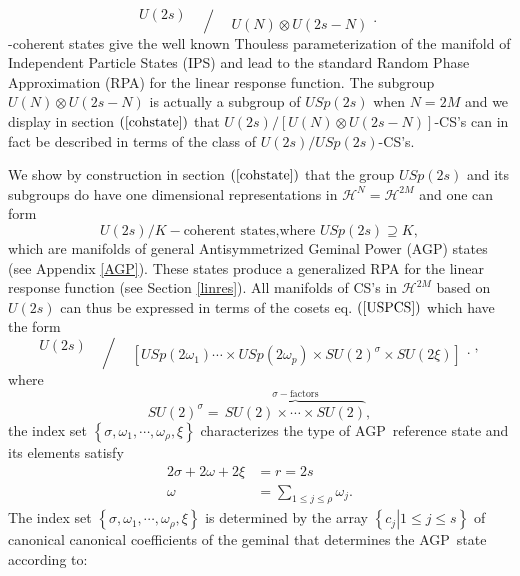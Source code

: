 \documentclass[aps,preprint]{revtex4}%
\begin{document}
\begin{equation}
U\left(  2s\right)
\genfrac{/}{.}{0pt}{}{{}}{U\left(  N\right)  \otimes U\left(  2s-N\right)  }%
\end{equation}
-coherent states give the well known Thouless parameterization \cite{thouless}
of the manifold of Independent Particle States (IPS) and lead to the standard
Random Phase Approximation (RPA) for the linear response function. The
subgroup $U\left(  N\right)  \otimes U\left(  2s-N\right)  $ is actually a
subgroup of $USp\left(  2s\right)  $ when $N=2M$ and we display in section
$\left(  \ref{cohstate}\right)  $ that $U\left(  2s\right)  /\left[  U\left(
N\right)  \otimes U\left(  2s-N\right)  \right]  $-CS's can in fact be
described in terms of the class of $U\left(  2s\right)  /USp\left(  2s\right)
$-CS's.

We show by construction in section $\left(  \ref{cohstate}\right)  $ that the
group $USp\left(  2s\right)  $ and its subgroups do have one dimensional
representations in $\mathcal{H}^{N}=\mathcal{H}^{2M}$ and one can form
\begin{equation}
U\left(  2s\right)  /K-\text{coherent states,where }USp\left(  2s\right)
\supseteq K, \label{USPCS}%
\end{equation}
which are manifolds of general Antisymmetrized Geminal Power (AGP) states (see
Appendix \ref{AGP}). These states produce a generalized RPA for the linear
response function (see Section \ref{linres}). All manifolds of CS's in
$\mathcal{H}^{2M}$ based on $U\left(  2s\right)  $ can thus be expressed in
terms of the cosets eq. $\left(  \ref{USPCS}\right)  $ which have the form
\begin{equation}
U\left(  2s\right)
\genfrac{/}{.}{0pt}{}{{}}{\left[  USp\left(  2\omega_{1}\right)  \cdots\times
USp\left(  2\omega_{p}\right)  \times SU\left(  2\right)  ^{\sigma}\times
SU\left(  2\xi\right)  \right]  }%
,
\end{equation}
where
\begin{equation}
SU\left(  2\right)  ^{\sigma}=\,\overset{\sigma-\text{factors}}{\overbrace
{SU\left(  2\right)  \times\cdots\times SU\left(  2\right)  }},
\end{equation}
the index set $\left\{  \sigma,\omega_{1},\cdots,\omega_{\rho},\xi\right\}  $
characterizes the type of AGP\ reference state and its elements satisfy
\begin{align}
2\sigma+2\omega+2\xi &  =r=2s\nonumber\\
\omega &  =\sum_{1\leq j\leq\rho}\omega_{j}.
\end{align}
The index set $\left\{  \sigma,\omega_{1},\cdots,\omega_{\rho},\xi\right\}  $
is determined by the array $\left\{  \left.  c_{j}\right\vert 1\leq j\leq
s\right\}  $ of canonical canonical coefficients \cite{weiner2003} of the
geminal that determines the AGP\ state according to:
\end{document}
